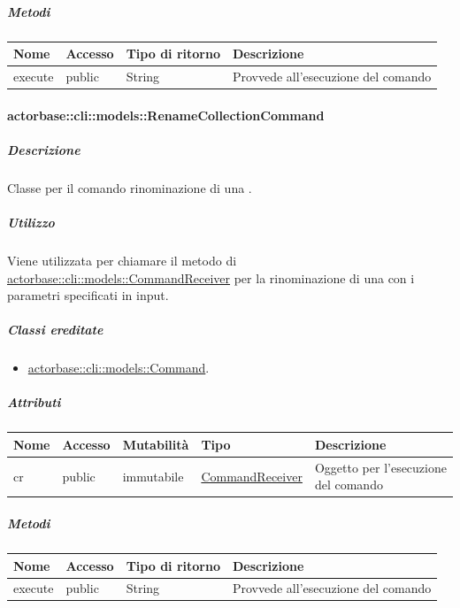 \documentclass{scalatekids-article}
\begin{document}
\subparagraph{Metodi}

\begin{tabular}{| l | l | l | l |}
  \hline
  Nome & Accesso & Tipo di ritorno & Descrizione\\
  \hline
  execute & public & String & Provvede all'esecuzione del comando\\
  \hline
\end{tabular}

\paragraph{actorbase::cli::models::RenameCollectionCommand}
\label{sec:actorbase::cli::models::RenameCollectionCommand}

\subparagraph{Descrizione}

Classe per il comando rinominazione di una .

\subparagraph{Utilizzo}

Viene utilizzata per chiamare il metodo di \hyperref[sec:actorbase::cli::models::CommandReceiver]{actorbase::cli::models::CommandReceiver} per la rinominazione di una  con i parametri specificati in input.

\subparagraph{Classi ereditate}

\begin{itemize}
\item \hyperref[sec:actorbase::cli::models::Command]{actorbase::cli::models::Command}.
\end{itemize}

\subparagraph{Attributi}

\begin{tabular}{| p{1cm} | p{1.5cm} | p{2cm} | p{4cm} | p{8.5cm} |}
  \hline
  Nome & Accesso & Mutabilità & Tipo & Descrizione\\
  \hline
  cr & public & immutabile & \hyperref[sec:actorbase::cli::models::CommandReceiver]{CommandReceiver} & Oggetto per l'esecuzione del comando\\
  \hline
\end{tabular}

\subparagraph{Metodi}

\begin{tabular}{| l | l | l | l |}
  \hline
  Nome & Accesso & Tipo di ritorno & Descrizione\\
  \hline
  execute & public & String & Provvede all'esecuzione del comando\\
  \hline
\end{tabular}
\end{document}
